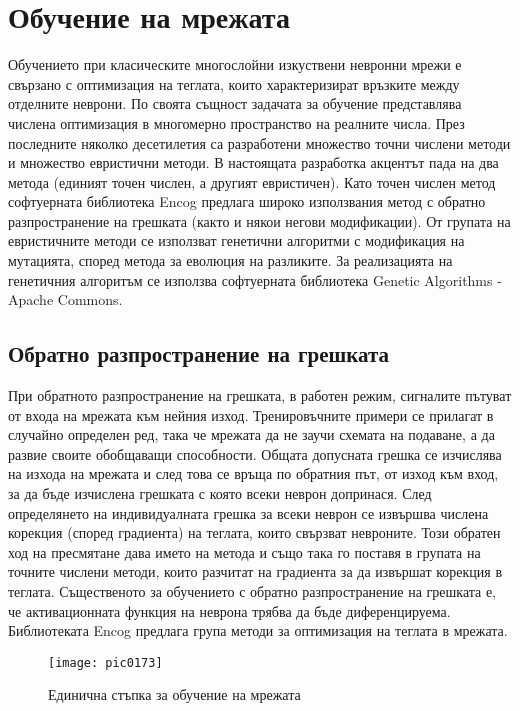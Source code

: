 \newpage
\chapter{Обучение на мрежата}
\label{chapter07}

Обучението при класическите многослойни изкуствени невронни мрежи е свързано с оптимизация на теглата, които характеризират връзките между отделните неврони. По своята същност задачата за обучение представлява числена оптимизация в многомерно пространство на реалните числа. През последните няколко десетилетия са разработени множество точни числени методи и множество евристични методи. В настоящата разработка акцентът пада на два метода (единият точен числен, а другият евристичен). Като точен числен метод софтуерната библиотека Encog предлага широко използвания метод с обратно разпространение на грешката (както и някои негови модификации). От групата на евристичните методи се използват генетични алгоритми с модификация на мутацията, според метода за еволюция на разликите. За реализацията на генетичния алгоритъм се използва софтуерната библиотека Genetic Algorithms - Apache Commons.

\section{Обратно разпространение на грешката}

При обратното разпространение на грешката, в работен режим, сигналите пътуват от входа на мрежата към нейния изход. Тренировъчните примери се прилагат в случайно определен ред, така че мрежата да не заучи схемата на подаване, а да развие своите обобщаващи способности. Общата допусната грешка се изчислява на изхода на мрежата и след това се връща по обратния път, от изход към вход, за да бъде изчислена грешката с която всеки неврон допринася. След определянето на индивидуалната грешка за всеки неврон се извършва числена корекция (според градиента) на теглата, които свързват невроните. Този обратен ход на пресмятане дава името на метода и също така го поставя в групата на точните числени методи, които разчитат на градиента за да извършат корекция в теглата. Същественото за обучението с обратно разпространение на грешката е, че активационната функция на неврона трябва да бъде диференцируема. Библиотеката Encog предлага група методи за оптимизация на теглата в мрежата. 

\begin{figure}[h]
  \centering
  \texttt{[image: pic0173]}
  \caption{Единична стъпка за обучение на мрежата}
\label{fig:pic0173}
\end{figure}
\FloatBarrier

